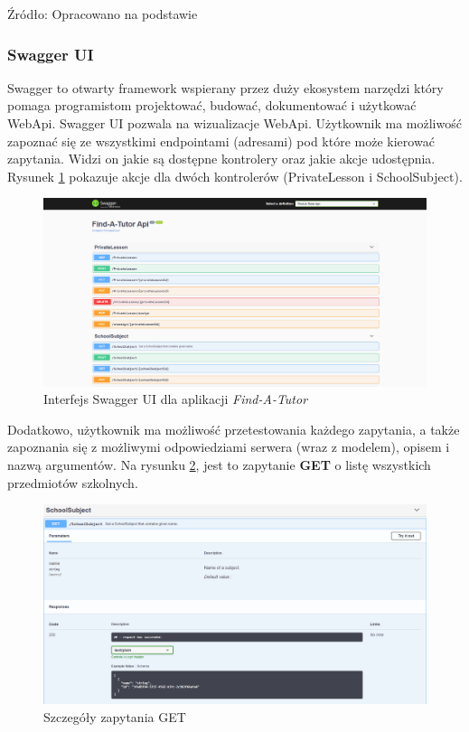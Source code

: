 \documentclass[12pt]{article}
\numberwithin{figure}{section}
\begin{document}
    Źródło: Opracowano na podstawie \cite{token-diagram}
    
    \subsubsection{Swagger UI}
    Swagger to otwarty framework wspierany przez duży ekosystem narzędzi który pomaga programistom projektować, budować, dokumentować i użytkować WebApi. 
    Swagger UI pozwala na wizualizacje WebApi. Użytkownik ma możliwość zapoznać się ze wszystkimi endpointami (adresami) pod które może kierować zapytania. Widzi on jakie są dostępne kontrolery oraz jakie akcje udostępnia. Rysunek \ref{fig:swagger} pokazuje akcje dla dwóch kontrolerów (PrivateLesson i SchoolSubject). 
    
    \begin{figure}[H] 
     	\centering
    	\includegraphics[width=1\textwidth]{images/chapter_3/swagger.png}
    	\caption{Interfejs Swagger UI dla aplikacji \textit{Find-A-Tutor}}
    	\label{fig:swagger}
    \end{figure}
    
    Dodatkowo, użytkownik ma możliwość przetestowania każdego zapytania, a także zapoznania się z możliwymi odpowiedziami serwera (wraz z modelem), opisem i nazwą argumentów. Na rysunku \ref{fig:swagger-get}, jest to zapytanie \textbf{GET} o listę wszystkich przedmiotów szkolnych. 
    
    \begin{figure}[H] 
     	\centering
    	\includegraphics[width=1\textwidth]{images/chapter_3/swagger-get.png}
    	\caption{Szczegóły zapytania GET}
    	\label{fig:swagger-get}
    \end{figure}
    
\end{document}

